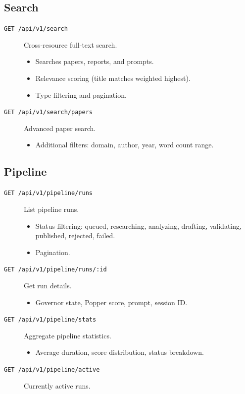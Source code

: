 \subsection{Search}

\begin{description}
  \item[\texttt{GET /api/v1/search}] Cross-resource full-text search.
  \begin{itemize}
    \item Searches papers, reports, and prompts.
    \item Relevance scoring (title matches weighted highest).
    \item Type filtering and pagination.
  \end{itemize}

  \item[\texttt{GET /api/v1/search/papers}] Advanced paper search.
  \begin{itemize}
    \item Additional filters: domain, author, year, word count range.
  \end{itemize}
\end{description}

\subsection{Pipeline}

\begin{description}
  \item[\texttt{GET /api/v1/pipeline/runs}] List pipeline runs.
  \begin{itemize}
    \item Status filtering: queued, researching, analyzing, drafting, validating, published, rejected, failed.
    \item Pagination.
  \end{itemize}

  \item[\texttt{GET /api/v1/pipeline/runs/:id}] Get run details.
  \begin{itemize}
    \item Governor state, Popper score, prompt, session ID.
  \end{itemize}

  \item[\texttt{GET /api/v1/pipeline/stats}] Aggregate pipeline statistics.
  \begin{itemize}
    \item Average duration, score distribution, status breakdown.
  \end{itemize}

  \item[\texttt{GET /api/v1/pipeline/active}] Currently active runs.
\end{description}

